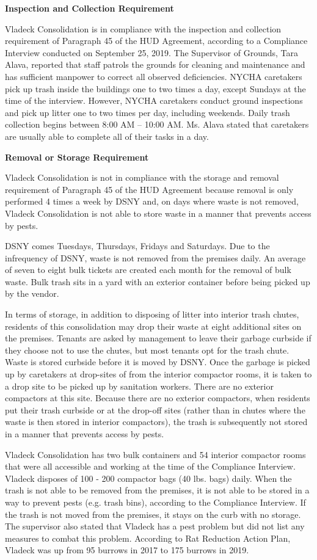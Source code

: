 
\textbf{Inspection and Collection Requirement}

Vladeck Consolidation is in compliance with the inspection and collection requirement of  Paragraph 45 of the HUD Agreement, according to a Compliance Interview conducted on September 25, 2019. The Supervisor of Grounds, Tara Alava, reported that staff patrols the grounds for cleaning and maintenance and has sufficient manpower to correct all observed deficiencies. NYCHA caretakers pick up trash inside the buildings one to two times a day, except Sundays at the time of the interview. However, NYCHA caretakers conduct ground inspections and pick up litter one to two times per day, including weekends. Daily trash collection begins between 8:00 AM -- 10:00 AM. Ms. Alava stated that caretakers are usually able to complete all of their tasks in a day.

\textbf{Removal or Storage Requirement}

Vladeck Consolidation is not in compliance with the storage and removal requirement of Paragraph 45 of the HUD Agreement because removal is only performed 4 times a week by DSNY and, on days where waste is not removed, Vladeck Consolidation is not able to store waste in a manner that prevents access by pests. 

DSNY comes Tuesdays, Thursdays, Fridays and Saturdays. Due to the infrequency of DSNY, waste is not removed from the premises daily. An average of seven to eight bulk tickets are created each month for the removal of bulk waste. Bulk trash sits in a yard with an exterior container before being picked up by the vendor.

In terms of storage, in addition to disposing of litter into interior trash chutes, residents of this consolidation may drop their waste at eight additional sites on the premises. Tenants are asked by management to leave their garbage curbside if they choose not to use the chutes, but most tenants opt for the trash chute. Waste is stored curbside before it is moved by DSNY. Once the garbage is picked up by caretakers at drop-sites of from the interior compactor rooms, it is taken to a drop site to be picked up by sanitation workers. There are no exterior compactors at this site. Because there are no exterior compactors, when residents put their trash curbside or at the drop-off sites (rather than in chutes where the waste is then stored in interior compactors), the trash is subsequently not stored in a manner that prevents access by pests.

Vladeck Consolidation has two bulk containers and 54 interior compactor rooms that were all accessible and working at the time of the Compliance Interview. Vladeck disposes of 100 - 200 compactor bags (40 lbs. bags) daily. When the trash is not able to be removed from the premises, it is not able to be stored in a way to prevent pests (e.g. trash bins), according to the Compliance Interview. If the trash is not moved from the premises, it stays on the curb with no storage. The supervisor also stated that Vladeck has a pest problem but did not list any measures to combat this problem. According to Rat Reduction Action Plan, Vladeck was up from 95 burrows in 2017 to 175 burrows in 2019.

